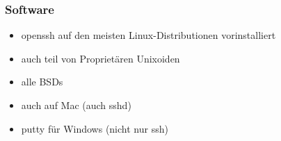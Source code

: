 \begin{frame}
\frametitle{Software}
\begin{itemize}
\item openssh auf den meisten Linux-Distributionen vorinstalliert
\pause
\item auch teil von Proprietären Unixoiden
\pause
\item alle BSDs
\pause
\item auch auf Mac (auch sshd)
\pause
\item putty für Windows (nicht nur ssh)
\end{itemize}
\end{frame}